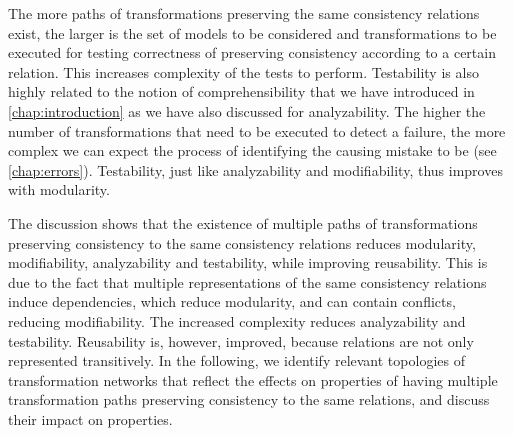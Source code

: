 \begin{properdescription}
    The more paths of transformations preserving the same consistency relations exist, the larger is the set of models to be considered and transformations to be executed for testing correctness of preserving consistency according to a certain relation.
    This increases complexity of the tests to perform.
    Testability is also highly related to the notion of comprehensibility that we have introduced in \autoref{chap:introduction} as we have also discussed for analyzability. 
    The higher the number of transformations that need to be executed to detect a failure, the more complex we can expect the process of identifying the causing mistake to be (see \autoref{chap:errors}).
    Testability, just like analyzability and modifiability, thus improves with modularity.
\end{properdescription}

The discussion shows that the existence of multiple paths of transformations preserving consistency to the same consistency relations reduces modularity, modifiability, analyzability and testability, while improving reusability.
This is due to the fact that multiple representations of the same consistency relations induce dependencies, which reduce modularity, and can contain conflicts, reducing modifiability.
The increased complexity reduces analyzability and testability.
Reusability is, however, improved, because relations are not only represented transitively.
In the following, we identify relevant topologies of transformation networks that reflect the effects on properties of having multiple transformation paths preserving consistency to the same relations, and discuss their impact on properties.
